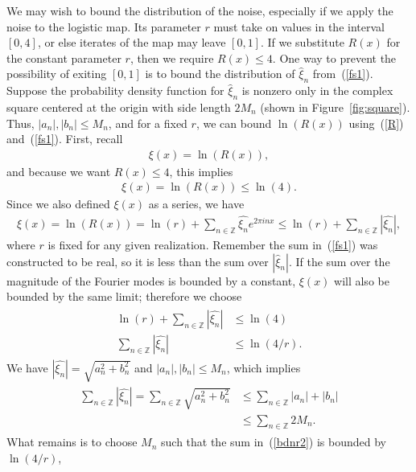 We may wish to bound the distribution of the noise, especially if we
apply the noise to the logistic map. Its parameter $r$ must take on
values in the interval $[0,4]$, or else iterates of the map may leave $[0,1]$. If we
substitute $R(x)$ for the constant parameter $r$, then we require
$R(x) \leq 4$. One way to prevent the possibility of exiting $[0,1]$ is to bound the distribution of $\hat{\xi}_n$ from~(\ref{fs1}). Suppose the probability density
function for $\hat{\xi}_n$ is nonzero only in the complex square centered at the
origin with side length $2M_n$ (shown in Figure~\ref{fig:square}). Thus, $|a_n|,|b_n| \leq M_n$, and for a fixed $r$, we
can bound $\ln(R(x))$ using~(\ref{R}) and~(\ref{fs1}). First, recall
\begin{align*}
\xi(x) = \ln(R(x)),
\end{align*}
and because we want $R(x) \leq 4$, this implies
\begin{align*}
\xi(x) = \ln(R(x)) \leq \ln(4).
\end{align*}
Since we also defined $\xi(x)$ as a series, we have
\begin{align*}
\xi(x) =\ln(R(x))= \ln(r) + \sum_{n \in \mathbb{Z}}\hat{\xi_n}e^{2\pi inx} \leq \ln(r) + \sum_{n \in \mathbb{Z}}|\hat{\xi_n}|,
\end{align*}
where $r$ is fixed for any given realization. Remember the sum
in~(\ref{fs1}) was constructed to be real, so it is less than the sum
over $|\hat{\xi}_n|$. If the sum over the magnitude of the Fourier modes is bounded by a constant, $\xi(x)$ will also be bounded by the same limit; therefore we choose
\begin{align*}
\begin{split}
\ln(r) + \sum_{n \in \mathbb{Z}}|\hat{\xi_n}| &\leq \ln(4)\\
\sum_{n \in \mathbb{Z}}|\hat{\xi_n}| &\leq \ln(4/r).
\end{split}
\end{align*}
We have $|\hat{\xi_n}| = \sqrt{a_n^2 + b_n^2}$ and $|a_n|,|b_n| \leq M_n$, which implies
\begin{align}
\begin{split}\label{bdnr2}
\sum_{n \in \mathbb{Z}}|\hat{\xi_n}| =\sum_{n \in \mathbb{Z}}\sqrt{a_n^2 + b_n^2} &\leq \sum_{n \in
  \mathbb{Z}}|a_n| + |b_n|\\
&\leq \sum_{n \in \mathbb{Z}}2M_n.
\end{split}
\end{align}
What remains is to choose $M_n$ such that the sum in~(\ref{bdnr2}) is
bounded by $\ln(4/r)$,
